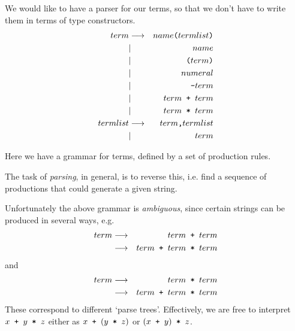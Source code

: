 \begin{slide*}


\vspace*{0.5cm}

We would like to have a parser for our terms, so that we don't have to write
them in terms of type constructors.
{\red
\begin{eqnarray*}
term     & \goesto & name{\verb!(!} termlist {\verb!)!}         \\
         & |       & name                                       \\
         & |       & {\verb!(!} term {\verb!)!}                 \\
         & |       & numeral                                    \\
         & |       & {\verb!-!} term                            \\
         & |       & term {\verb! + !} term                     \\
         & |       & term {\verb! * !} term                     \\
termlist & \goesto & term {\verb!,!} termlist                   \\
         & |       & term
\end{eqnarray*}}

Here we have a grammar for terms, defined by a set of production rules.

\end{slide*}


\begin{slide*}


\vspace*{0.5cm}

The task of {\em parsing}, in general, is to reverse this, i.e. find a sequence
of productions that could generate a given string.

Unfortunately the above grammar is {\em ambiguous}, since certain strings can
be produced in several ways, e.g.
{\red
\begin{eqnarray*}
term     & \goesto & term {\verb! + !} term                             \\
         & \goesto & term {\verb! + !} term {\verb! * !} term
\end{eqnarray*}}
\noindent and
{\red
\begin{eqnarray*}
term     & \goesto & term {\verb! * !} term                             \\
         & \goesto & term {\verb! + !} term {\verb! * !} term
\end{eqnarray*}}
These correspond to different `parse trees'. Effectively, we are free to
interpret {\red $x {\verb! + !} y {\verb! * !} z$} either as {\red $x
{\verb! + !} (y {\verb! * !} z)$} or {\red $(x {\verb! + !} y) {\verb! * !}
z$}.

\end{slide*}


